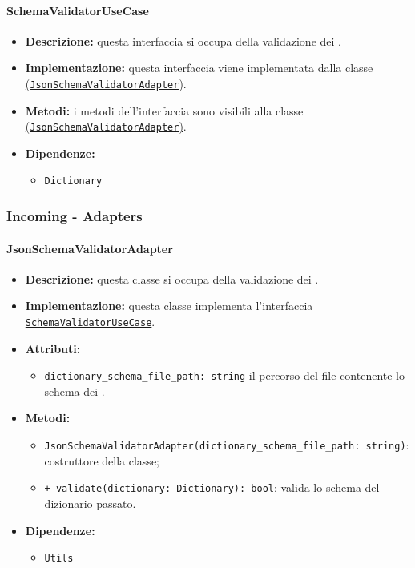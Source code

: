 \paragraph{SchemaValidatorUseCase} \label{SchemaValidatorUseCase}
\begin{itemize}
    \item \textbf{Descrizione:} questa interfaccia si occupa della validazione dei .
    \item \textbf{Implementazione:} questa interfaccia viene implementata dalla classe \hyperref[JsonSchemaValidatorAdapter]{(\texttt{JsonSchemaValidatorAdapter})}.
    \item \textbf{Metodi:} i metodi dell'interfaccia sono visibili alla classe \hyperref[JsonSchemaValidatorAdapter]{(\texttt{JsonSchemaValidatorAdapter})}.
    \item \textbf{Dipendenze:}
    \begin{itemize}
        \item \texttt{Dictionary}
    \end{itemize}
\end{itemize}  

\subsubsection{Incoming - Adapters}

\paragraph{JsonSchemaValidatorAdapter} \label{JsonSchemaValidatorAdapter}
\begin{itemize}
    \item \textbf{Descrizione:} questa classe si occupa della validazione dei .
    \item \textbf{Implementazione:} questa classe implementa l'interfaccia \hyperref[SchemaValidatorUseCase]{\texttt{SchemaValidatorUseCase}}.
    \item \textbf{Attributi:}
    \begin{itemize}
        \item \texttt{dictionary\_schema\_file\_path: string} il percorso del file contenente lo schema dei .
    \end{itemize}
    \item \textbf{Metodi:}
    \begin{itemize}
        \item \texttt{JsonSchemaValidatorAdapter(dictionary\_schema\_file\_path: string)}: costruttore della classe;
        \item \texttt{+ validate(dictionary: Dictionary): bool}: valida lo schema del dizionario passato.
    \end{itemize}
    \item \textbf{Dipendenze:}
    \begin{itemize}
        \item \texttt{Utils}
    \end{itemize}
\end{itemize} 


